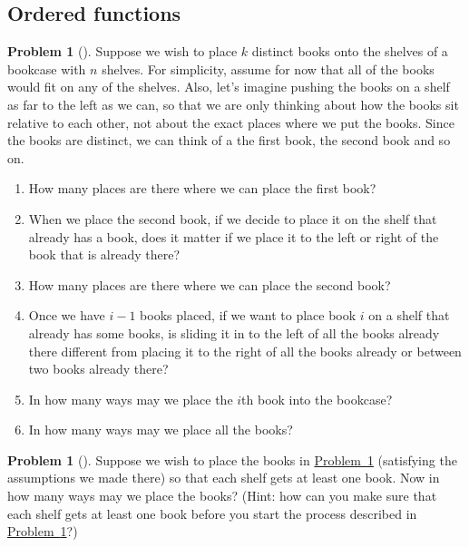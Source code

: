\documentclass[10pt,]{book}
\theoremstyle{plain}
\theoremstyle{definition}
\newtheorem{activity}[project]{Problem}
\theoremstyle{definition}
\numberwithin{equation}{chapter}
\begin{document}
\subsection[{Ordered functions}]{Ordered functions}\label{orderedfunctionsection}
\begin{activity}[]\marginsymbol[-1em]{} \label{bookcase}
Suppose we wish to place \(k\) distinct books onto the shelves of a bookcase with \(n\) shelves. For simplicity, assume for now that all of the books would fit on any of the shelves. Also, let's imagine pushing the books on a shelf as far to the left as we can, so that we are only thinking about how the books sit relative to each other, not about the exact places where we put the books. Since the books are distinct, we can think of a the first book, the second book and so on.%
\begin{enumerate}[font=\bfseries,label=(\alph*),ref=\alph*]
\item\label{task-102} \marginsymbol[-2.5em]{} How many places are there where we can place the first book?%
\item\label{task-103} \marginsymbol[-2.5em]{} When we place the second book, if we decide to place it on the shelf that already has a book, does it matter if we place it to the left or right of the book that is already there?%
\item\label{task-104} \marginsymbol[-2.5em]{} How many places are there where we can place the second book?%
\item\label{task-105} \marginsymbol[-2.5em]{} Once we have \(i-1\) books placed, if we want to place book \(i\)  on a shelf that already has some books, is sliding it in to the left of all the books already there different from placing it to the right of all the books already or between two books already there?%
\item\label{task-106} \marginsymbol[-2.5em]{} In how many ways may we place the \(i\)th book into the bookcase?%
\item\label{task-107} \marginsymbol[-2.5em]{} In how many ways may we place all the books?%
\end{enumerate}
\end{activity}
\begin{activity}[]\marginsymbol[-1em]{} \label{bookcaseeveryshelf}
Suppose we wish to place the books in \hyperref[bookcase]{Problem~\ref{bookcase}} (satisfying the assumptions we made there) so that each shelf gets at least one book. Now in how many ways may we place the books? (Hint: how can you make sure that each shelf gets at least one book before you start the process described in \hyperref[bookcase]{Problem~\ref{bookcase}}?)%
\end{activity}
\end{document}
